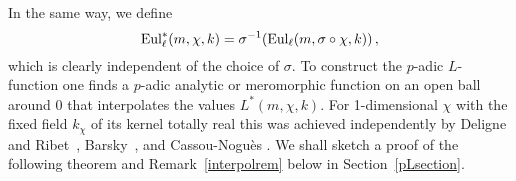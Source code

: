 \documentclass{amsart}
\begin{document}
In the same way, we define
\begin{equation}\label{sigmaeuler}
{\textup{Eul}}^\ast_\ell(m, \chi, k) = \sigma^{-1} ({\textup{Eul}}_\ell(m,\sigma\circ\chi, k)) \,,
\end{equation}
which is clearly independent of the choice of $ {\sigma} $.  To construct
the {$p$-adic{\futurelet{}}} {$L$-function{\futurelet{}}} one finds a {$p$-adic{\futurelet{}}} analytic or
meromorphic
function on an open ball around 0 that interpolates the values 
${L^\ast(m,{\chi},k)}$.  For 1-dimensional $ \chi $ with
the fixed field $ k_\chi $ of its kernel totally
real this was achieved independently by Deligne and Ribet~\cite{Del-Rib},
Barsky~\cite{Bar78}, and Cassou-Nogu\`es \cite{Cas-Nog78, Cas-Nog79}.  We shall sketch a proof of
the following theorem and Remark~\ref{interpolrem} below in Section~\ref{pLsection}.
\end{document}

